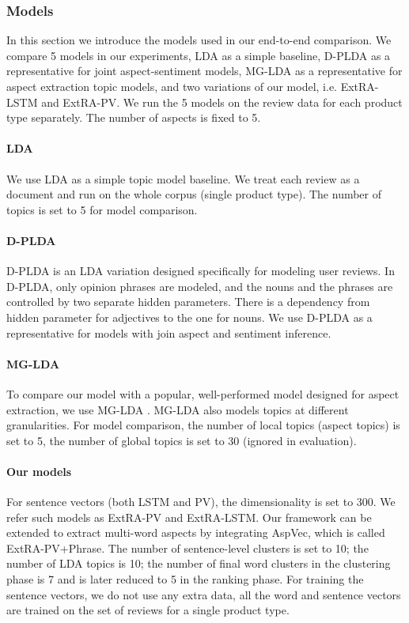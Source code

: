 \subsubsection{Models}

In this section we introduce the models used in our end-to-end comparison.
We compare 5 models in our experiments, 
LDA as a simple baseline, 
D-PLDA \cite{moghaddam2012design} as a representative for joint aspect-sentiment models, 
MG-LDA \cite{titov2008modeling} as a representative for aspect extraction topic models,
and two variations of our model, i.e. ExtRA-LSTM and ExtRA-PV. 
We run the 5 models on the review data for each product type separately. The number of aspects is fixed to 5.

\paragraph{LDA}
We use LDA as a simple topic model baseline. 
We treat each review as a document and run on the whole corpus (single product type). 
The number of topics is set to 5 for model comparison.

\paragraph{D-PLDA}
D-PLDA \cite{moghaddam2012design} is an LDA variation designed specifically for modeling user reviews. 
In D-PLDA, only opinion phrases are modeled, 
and the nouns and the phrases are controlled by two separate hidden parameters. There is a dependency from hidden parameter for adjectives to the one for nouns.
We use D-PLDA as a representative for models with join aspect and sentiment inference.


\paragraph{MG-LDA}
To compare our model with a popular, well-performed model designed for aspect extraction, 
we use MG-LDA \cite{titov2008modeling}. 
MG-LDA also models topics at different granularities. 
For model comparison, the number of local topics (aspect topics) is set to 5, 
the number of global topics is set to 30 (ignored in evaluation).

\paragraph{Our models}
\label{ourmodels}
For sentence vectors (both LSTM and PV), the dimensionality is set to 300.
We refer such models as ExtRA-PV and ExtRA-LSTM. Our framework can be extended to extract multi-word aspects by integrating AspVec, which is called ExtRA-PV+Phrase.
The number of sentence-level clusters is set to 10; the number of LDA topics is 10; the number of final word clusters in the clustering phase is 7 and is later reduced to 5 in the ranking phase. For training the sentence vectors, we do not use any extra data, all the word and sentence vectors are trained on the set of reviews for a single product type. 


